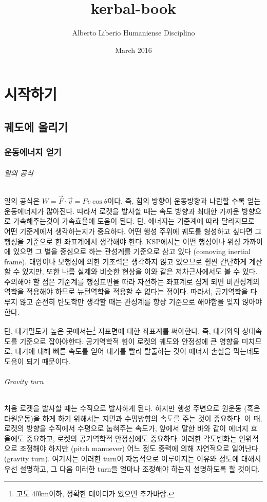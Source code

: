 \documentclass[9pt]{amsbook}
\title{kerbal-book}
\author{Alberto Liberio Humaniense Disciplino}
\date{March 2016}
\begin{document}
\maketitle
\sf

\tableofcontents
\part{시작하기}
\chapter{궤도에 올리기}
\section{운동에너지 얻기}
\paragraph{일의 공식}
일의 공식은 $W=\vec{F} \cdot \vec{v} = F v \cos\theta$이다. 
즉, 힘의 방향이 운동방향과 나란할 수록 얻는 운동에너지가 많아진다. 
따라서 로켓을 발사할 때는 속도 방향과 최대한 가까운 방향으로 가속해주는것이 가속효율에 도움이 된다.
단, 에너지는 기준계에 따라 달라지므로 어떤 기준계에서 생각하는지가 중요하다. 
어떤 행성 주위에 궤도를 형성하고 싶다면 그 행성을 기준으로 한 좌표계에서 생각해야 한다. 
KSP에서는 어떤 행성이나 위성 가까이에 있으면 그 별을 중심으로 하는 관성계를 기준으로 삼고 있다 (comoving inertial frame). 
태양이나 모행성에 의한 기조력은 생각하지 않고 있으므로 훨씬 간단하게 계산할 수 있지만, 또한 나름 실제와 비슷한 현상을 이와 같은 저차근사에서도 볼 수 있다. 
주의해야 할 점은 기준계를 행성표면을 따라 자전하는 좌표계로 잡게 되면 비관성계의 역학을 적용해야 하므로 뉴턴역학을 적용할 수 없다는 점이다. 
따라서, 공기역학을 다루지 않고 순전히 탄도학만 생각할 때는 관성계를 항상 기준으로 해야함을 잊지 않아야 한다.

단, 대기밀도가 높은 곳에서는\footnote{고도 40km이하, 정확한 데이터가 있으면 추가바람.} 지표면에 대한 좌표계를 써야한다. 즉, 대기와의 상대속도를 기준으로 잡아야한다. 공기역학적 힘이 로켓의 궤도와 안정성에 큰 영향을 미치므로, 대기에 대해 빠른 속도를 얻어 대기를 빨리 탈출하는 것이 에너지 손실을 막는데도 도움이 되기 때문이다.

\paragraph{Gravity turn}
처음 로켓을 발사할 때는 수직으로 발사하게 된다. 하지만 행성 주변으로 원운동 (혹은 타원운동)을 하게 하기 위해서는 지면과 수평방향의 속도를 주는 것이 중요하다. 
이 때, 로켓의 방향을 수직에서 수평으로 눕혀주는 속도가, 앞에서 말한 바와 같이 에너지 효율에도 중요하고, 로켓의 공기역학적 안정성에도 중요하다. 
이러한 각도변화는 인위적으로 조정해야 하지만 (pitch manuever) 어느 정도 중력에 의해 자연적으로 일어난다 (gravity turn).
여기서는 이러한 turn이 자동적으로 이루어지는 이유와 정도에 대해서 우선 설명하고, 그 다음 이러한 turn을 얼마나 조정해야 하는지 설명하도록 할 것이다.
\end{document}

